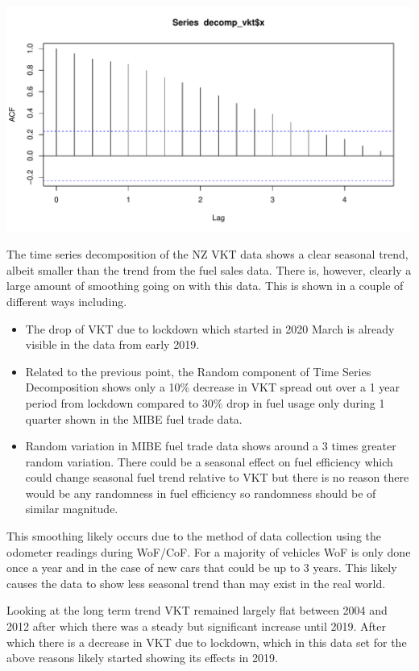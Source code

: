\documentclass[
]{article}
\begin{document}
\includegraphics{summary_week4_files/figure-latex/unnamed-chunk-3-1.pdf}

The time series decomposition of the NZ VKT data shows a clear seasonal
trend, albeit smaller than the trend from the fuel sales data. There is,
however, clearly a large amount of smoothing going on with this data.
This is shown in a couple of different ways including.

\begin{itemize}
\item The drop of VKT due to lockdown which started in 2020 March is already visible in the data from early 2019. 
\item Related to the previous point, the Random component of Time Series Decomposition shows only a 10\% decrease in VKT spread out over a 1 year period from lockdown compared to 30\% drop in fuel usage only during 1 quarter shown in the MIBE fuel trade data. 
\item Random variation in MIBE fuel trade data shows around a 3 times greater random variation. There could be a seasonal effect on fuel efficiency which could change seasonal fuel trend relative to VKT but there is no reason there would be any randomness in fuel efficiency so randomness should be of similar magnitude.
\end{itemize}

This smoothing likely occurs due to the method of data collection using
the odometer readings during WoF/CoF. For a majority of vehicles WoF is
only done once a year and in the case of new cars that could be up to 3
years. This likely causes the data to show less seasonal trend than may
exist in the real world.

Looking at the long term trend VKT remained largely flat between 2004
and 2012 after which there was a steady but significant increase until
2019. After which there is a decrease in VKT due to lockdown, which in
this data set for the above reasons likely started showing its effects
in 2019.
\end{document}

